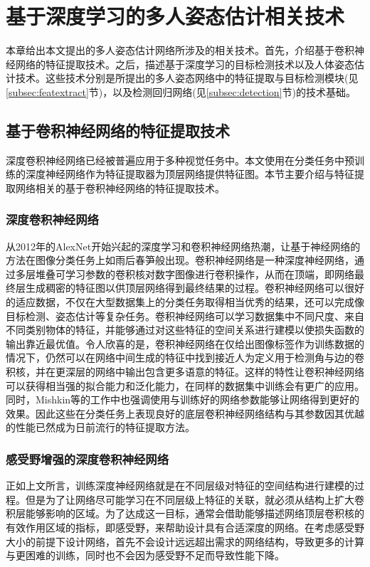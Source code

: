 \chapter{基于深度学习的多人姿态估计相关技术}
\label{cha:basicfacts}
本章给出本文提出的多人姿态估计网络所涉及的相关技术。首先，介绍基于卷积神经网络的特征提取技术。之后，描述基于深度学习的目标检测技术以及人体姿态估计技术。这些技术分别是所提出的多人姿态网络中的特征提取与目标检测模块(见\ref{subsec:featextract}节)，以及检测回归网络(见\ref{subsec:detection}节)的技术基础。
\section{基于卷积神经网络的特征提取技术}
深度卷积神经网络已经被普遍应用于多种视觉任务中。本文使用在分类任务中预训练的深度神经网络作为特征提取器为顶层网络提供特征图。本节主要介绍与特征提取网络相关的基于卷积神经网络的特征提取技术。
\subsection{深度卷积神经网络}
\label{subsec:factsfeature}
从2012年的AlexNet\cite{alex2012alexnet}开始兴起的深度学习和卷积神经网络热潮，让基于神经网络的方法在图像分类任务上如雨后春笋般出现。卷积神经网络是一种深度神经网络，通过多层堆叠可学习参数的卷积核对数字图像进行卷积操作，从而在顶端，即网络最终层生成稠密的特征图以供顶层网络得到最终结果的过程。卷积神经网络可以很好的适应数据，不仅在大型数据集上的分类任务取得相当优秀的结果\cite{simonyan2014very}，还可以完成像目标检测、姿态估计等复杂任务。卷积神经网络可以学习数据集中不同尺度、来自不同类别物体的特征，并能够通过对这些特征的空间关系进行建模以使损失函数的输出靠近最优值。令人欣喜的是，卷积神经网络在仅给出图像标签作为训练数据的情况下，仍然可以在网络中间生成的特征中找到接近人为定义用于检测角与边的卷积核，并在更深层的网络中输出包含更多语意的特征\cite{yosinski2015understanding}。这样的特性让卷积神经网络可以获得相当强的拟合能力和泛化能力，在同样的数据集中训练会有更广的应用。同时，Mishkin等的工作中\cite{mishkin2015all}也强调使用与训练好的网络参数能够让网络得到更好的效果。因此这些在分类任务上表现良好的底层卷积神经网络结构与其参数因其优越的性能已然成为日前流行的特征提取方法。
\subsection{感受野增强的深度卷积神经网络}
\label{subsec:factsdeepextract}
正如上文所言，训练深度神经网络就是在不同层级对特征的空间结构进行建模的过程。但是为了让网络尽可能学习在不同层级上特征的关联，就必须从结构上扩大卷积层能够影响的区域。为了达成这一目标，通常会借助能够描述网络顶层卷积核的有效作用区域的指标，即感受野，来帮助设计具有合适深度的网络。在考虑感受野大小的前提下设计网络，首先不会设计远远超出需求的网络结构，导致更多的计算与更困难的训练，同时也不会因为感受野不足而导致性能下降。

